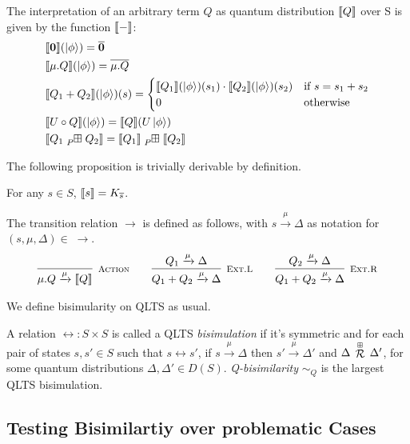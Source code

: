 The interpretation of an arbitrary term $Q$ as quantum distribution $\llbracket Q\rrbracket$ over S is given by the function $\llbracket{-}\rrbracket$:
\begin{align*}
	&\sem{\nil}(\ket{\phi}) = \overline{\nil}\\
	&\sem{\mu.Q}(\ket{\phi}) = \overline{\mu.Q}\\
	&\sem{Q_1 + Q_2}(\ket{\phi})(s) = 
	\begin{cases}
		\sem{Q_1}(\ket{\phi})(s_1) \cdot \sem{Q_2}(\ket{\phi})(s_2) & \text{if } s = s_1 + s_2\\
		0 & \text{otherwise}
	\end{cases}\\
	&\sem{U \circ Q}(\ket{\phi}) = \sem{Q}(U \ket{\phi})\\
	&\sem{Q_1 \qsum{P} Q_2} = \sem{Q_1} \qsum{P} \sem{Q_2}
\end{align*}

The following proposition is trivially derivable by definition.
\begin{proposition}
	For any $s \in S$, $\llbracket s\rrbracket = K_{\overline{s}}$.
\end{proposition}

The transition relation $\to$ is defined as follows, with $s \xrightarrow{\mu} \Delta$ as notation for $(s, \mu, \Delta) \in\;\to$.
\begin{gather*}
  \infer[\mbox{\footnotesize\scshape Action}]{\mu.Q \xrightarrow{\mu} \sem{Q}}{} \qquad 
  \infer[\mbox{\footnotesize\scshape Ext.L}]{Q_1 + Q_2 \xrightarrow{\mu} \Delta}{Q_1 \xrightarrow{\mu} \Delta} \qquad
  \infer[\mbox{\footnotesize\scshape Ext.R}]{Q_1 + Q_2 \xrightarrow{\mu} \Delta}{Q_2 \xrightarrow{\mu} \Delta}
\end{gather*}

We define bisimularity on QLTS as usual.
\begin{definition}
	A relation $\rel : S \times S$ is called a QLTS \emph{bisimulation} if it's symmetric and for each pair of states $s, s' \in S$ such that $s \rel s'$,
	if $s \xrightarrow{\mu} \Delta$ then $s' \xrightarrow{\mu} \Delta'$ and $\Delta\,\stackrel{\scriptscriptstyle \boxplus}{\mathcal{R}}\,\Delta'$, for some quantum distributions $\Delta, \Delta' \in D(S)$.
	\emph{Q-bisimilarity} $\sim_Q$ is the largest QLTS bisimulation.
\end{definition}


\subsection{Testing Bisimilartiy over problematic Cases}

